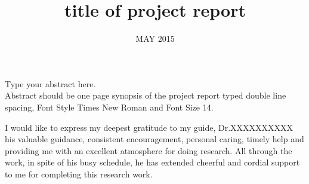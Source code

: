\documentclass[BTech]{srmuthesis}
\begin{document}

\title{title of project report} %

\firstauthorregno{[Reg No: 16305011]}
\secondauthorregno{[Reg No: 16305015]}
\thirdauthorregno{[Reg No: 16305264]}
\fourthauthorregno{[Reg No: 16305456]}
\fifthauthorregno{[Reg No: 16305876 ]}
\date{MAY 2015} %

\maketitle
\certificate





\abstract
\begin{doublespacing}
{\large\noindent Type your abstract here.\\

 Abstract should be one page synopsis of the project report typed double line spacing, Font Style Times New Roman and Font Size 14.}
\end{doublespacing}

\pagebreak
\acknowledgements
I would like to express my deepest gratitude to my guide, Dr.XXXXXXXXXX
his valuable guidance, consistent encouragement, personal caring, timely help and providing me with an excellent atmosphere for doing research. All through the work, in spite of his busy schedule, he has extended cheerful and cordial support to me for completing this research work.\\
\end{document}
